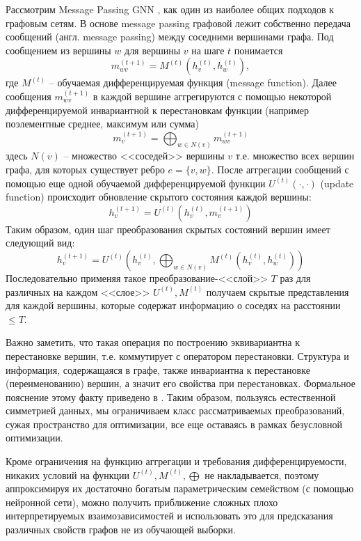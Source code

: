 \documentclass[a4paper,14pt]{extarticle}
\begin{document}
			 Рассмотрим Message Passing GNN  \cite{gilmer2017neural},\cite{https://doi.org/10.48550/arXiv.2005.12566} как один из наиболее общих подходов к графовым сетям. В основе message passing графовой лежит собственно передача сообщений (англ. message passing) между соседними вершинами графа. Под сообщением из вершины $w$ для вершины $v$ на шаге $t$ понимается 
			 $$m_{wv}^{(t+1)} = M^{(t)}(h_v^{(t)}, h_w^{(t)}),$$
			 где $M^{(t)}$ -- обучаемая дифференцируемая функция (message function). Далее сообщения $m_{wv}^{(t+1)}$ в каждой вершине аггрегируются с помощью некоторой дифференцируемой инвариантной к перестановкам функции (например поэлементные среднее, максимум или сумма)
			 $$m_v^{(t+1)} = \bigoplus_{w\in N(v)} m_{wv}^{(t+1)}$$
			 здесь $N(v)$ -- множество <<соседей>> вершины $v$ т.е. множество всех вершин графа, для которых существует ребро $e =\{v,w\}$.
			 После аггрегации сообщений с помощью еще одной обучаемой дифференцируемой функции $U^{(t)}(\cdot, \cdot)$ (update function) происходит обновление скрытого состояния каждой вершины:
			 $$h_v^{(t+1)} = U^{(t)}\left(h_v^{(t)}, m_v^{(t+1)}\right)$$
			 Таким образом, один шаг преобразования скрытых состояний вершин имеет следующий вид:
			  $$h_v^{(t+1)} = U^{(t)}\left(h_v^{(t)}, \bigoplus_{w\in N(v)}M^{(t)}\left( h_v^{(t)}, h_w^{(t)}\right)\right)$$
			  Последовательно применяя такое преобразование-<<слой>> $T$ раз для различных на каждом <<слое>> $U^{(t)}, M^{(t)}$ получаем скрытые представления для каждой вершины, которые содержат информацию о соседях на расстоянии $\leqslant T$. 
			  
			  Важно заметить, что такая операция по построению эквивариантна к перестановке вершин, т.е. коммутирует с оператором перестановки. Структура и информация, содержащаяся в графе, также инвариантна к перестановке (переименованию) вершин, а значит его свойства при перестановках. Формальное пояснение этому факту приведено в \cite{bronstein2021geometric}.
			  Таким образом, пользуясь естественной симметрией данных, мы ограничиваем класс рассматриваемых преобразований, сужая пространство для оптимизации, все еще оставаясь в рамках безусловной оптимизации.
			  
			  Кроме ограничения на функцию аггрегации и требования дифференцируемости, никаких условий на функции $U^{(t)}, M^{(t)}, \bigoplus$ не накладывается, поэтому аппроксимируя их достаточно богатым параметрическим семейством (с помощью нейронной сети), можно получить приближение сложных плохо интерпретируемых взаимозависимостей и использовать это для предсказания различных свойств графов не из обучающей выборки.
			  
\end{document}
